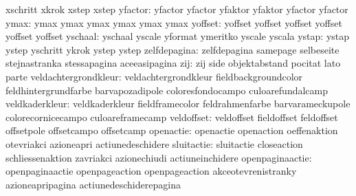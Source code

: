                            xschritt                  xkrok
                           xstep                     xstep %
                  yfactor: yfactor                   yfactor
                           yfaktor                   yfaktor
                           yfactor                   yfactor %
                     ymax: ymax                      ymax
                           ymax                      ymax
                           ymax                      ymax %
                  yoffset: yoffset                   yoffset
                           yoffset                   yoffset
                           yoffset                   yoffset %
                  yschaal: yschaal                   yscale
                           yformat                   ymeritko
                           yscale                    yscala %
                    ystap: ystap                     ystep
                           yschritt                  ykrok
                           ystep                     ystep %
             zelfdepagina: zelfdepagina              samepage
                           selbeseite                stejnastranka
                           stessapagina              aceeasipagina
                      zij: zij                       side
                           objektabstand             pocitat
                           lato                      parte
     veldachtergrondkleur: veldachtergrondkleur      fieldbackgroundcolor
                           feldhintergrundfarbe      barvapozadipole
                           coloresfondocampo         culoarefundalcamp
           veldkaderkleur: veldkaderkleur            fieldframecolor
                           feldrahmenfarbe           barvarameckupole
                           colorecornicecampo        culoareframecamp
               veldoffset: veldoffset                fieldoffset
                           feldoffset                offsetpole
                           offsetcampo               offsetcamp
                openactie: openactie                 openaction
                           oeffenaktion              otevriakci
                           azioneapri                actiunedeschidere
               sluitactie: sluitactie                closeaction
                           schliessenaktion          zavriakci
                           azionechiudi              actiuneinchidere
          openpaginaactie: openpaginaactie           openpageaction
                           openpageaction            akceotevrenistranky
                           azioneapripagina          actiunedeschiderepagina %
